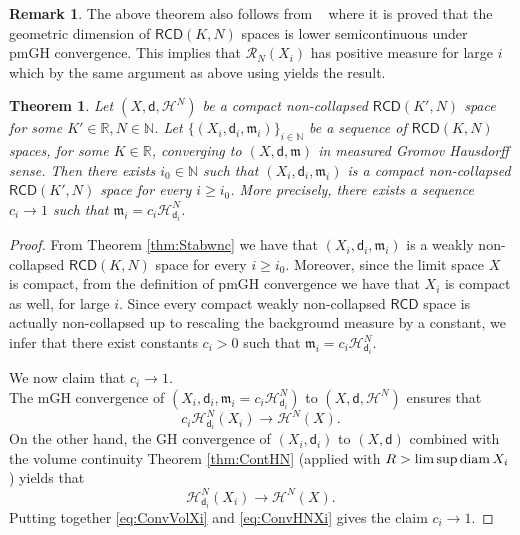 \documentclass[a4paper]{amsart}
\theoremstyle{plain}
\newtheorem{theorem}[lemma]{Theorem}
\theoremstyle{definition}
\newtheorem{remark}[lemma]{Remark}
\numberwithin{equation}{section}
\newcommand{\R}{\mathbb{R}}
\newcommand{\N}{\mathbb{N}}
\newcommand{\diam}{{\rm diam\,}}
\newcommand{\RCD}{\mathsf{RCD}}
\newcommand{\mm}{\mathfrak m}
\newcommand{\sfd}{\mathsf d}
\newcommand{\cH}{\mathcal{H}}
\begin{document}
{{{
\begin{remark}
The above theorem also follows from ~\cite{KitaPOTA} where it is proved that the geometric dimension of $\RCD(K,N)$ spaces is lower semicontinuous under pmGH convergence. This implies that  $\mathcal R_N(X_i)$ has positive measure for large $i$ which by the same argument as above using \cite[Theorem 1.2]{KM} yields the result. 
\end{remark}
}
\begin{theorem}\label{thm:Stabnc}
Let $(X,\sfd,\cH^{N})$ be a compact non-collapsed $\RCD(K',N)$ space for some $K'\in \R, N\in \N$. Let $\{(X_{i}, \sfd_{i},\mm_{i})\}_{i\in \N}$ be a sequence of $\RCD(K,N)$ spaces, for some $K\in \R$,  converging to 
$(X,\sfd,\mm)$ in measured Gromov Hausdorff sense. Then there exists $i_{0}\in \N$ such that $(X_{i}, \sfd_{i},\mm_{i})$ is a compact non-collapsed $\RCD(K',N)$ space for every $i\geq i_{0}$.
More precisely, there exists a sequence $c_{i}\to 1$ such that $\mm_{i}=c_{i} \cH^{N}_{\sfd_{i}}$.
\end{theorem}

\begin{proof}
From Theorem \ref{thm:Stabwnc} we have that  $(X_{i}, \sfd_{i},\mm_{i})$ is a  weakly non-collapsed $\RCD(K,N)$ space for every $i\geq i_{0}$. Moreover, since the limit space $X$ is compact,  from the definition of pmGH convergence we have that $X_{i}$ is compact as well, for large $i$. Since every compact weakly non-collapsed $\RCD$ space is actually non-collapsed \cite{HondaNC} up to rescaling the background measure by a constant, we infer that there exist constants $c_{i}>0$ such that $\mm_{i}=c_{i} \cH^{N}_{\sfd_{i}}$.

We now claim that $c_{i}\to 1$.
\\The mGH convergence of $(X_{i}, \sfd_{i},\mm_{i}=c_{i} \cH^{N}_{\sfd_{i}})$ to $(X,\sfd,\cH^{N})$ ensures that 
\begin{equation}\label{eq:ConvVolXi}
c_{i} \cH^{N}_{\sfd_{i}}(X_{i}) \to \cH^{N}(X).
\end{equation}
On the other hand, the GH convergence of  $(X_{i}, \sfd_{i})$ to $(X,\sfd)$ combined with the volume continuity Theorem \ref{thm:ContHN} (applied with  $R>\limsup \diam X_{i}$) yields that
\begin{equation}\label{eq:ConvHNXi}
\cH^{N}_{\sfd_{i}}(X_{i}) \to \cH^{N}(X).
\end{equation}
Putting together \eqref{eq:ConvVolXi} and  \eqref{eq:ConvHNXi} gives the claim $c_{i}\to 1$.
\end{proof}
{

}}}
\end{document}
